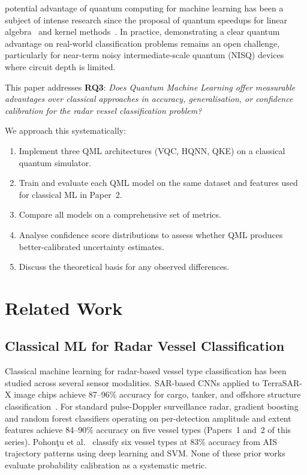 \documentclass[journal]{IEEEtran}
\begin{document}
 potential advantage of quantum computing for machine
learning has been a subject of intense research since the proposal of quantum
speedups for linear
algebra~\cite{harrow2009} and kernel methods~\cite{havlicek2019supervised}.
In practice, demonstrating a clear quantum advantage on real-world classification
problems remains an open challenge, particularly for near-term noisy
intermediate-scale quantum (NISQ) devices where circuit depth is limited.

This paper addresses \textbf{RQ3}: \textit{Does Quantum Machine Learning offer
measurable advantages over classical approaches in accuracy, generalisation,
or confidence calibration for the radar vessel classification problem?}

We approach this systematically:
\begin{enumerate}
  \item Implement three QML architectures (VQC, HQNN, QKE) on a classical
        quantum simulator.
  \item Train and evaluate each QML model on the same dataset and features
        used for classical ML in Paper~2.
  \item Compare all models on a comprehensive set of metrics.
  \item Analyse confidence score distributions to assess whether QML produces
        better-calibrated uncertainty estimates.
  \item Discuss the theoretical basis for any observed differences.
\end{enumerate}

\section{Related Work}
\label{sec:relatedwork}

\subsection{Classical ML for Radar Vessel Classification}

Classical machine learning for radar-based vessel type classification has been studied across several sensor modalities. SAR-based CNNs applied to TerraSAR-X image chips achieve 87--96\% accuracy for cargo, tanker, and offshore structure classification~\cite{bentes2017sar}. For standard pulse-Doppler surveillance radar, gradient boosting and random forest classifiers operating on per-detection amplitude and extent features achieve 84--90\% accuracy on five vessel types (Papers~1 and~2 of this series). Pohon\c{t}u et al.~\cite{pohontzu2023trajectory} classify six vessel types at 83\% accuracy from AIS trajectory patterns using deep learning and SVM. None of these prior works evaluate probability calibration as a systematic metric.
\end{document}
